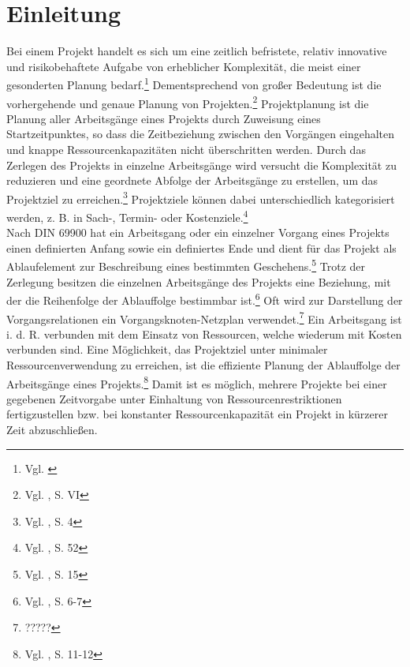 \documentclass[a4paper,12pt,parskip,bibtotoc,liststotoc]{article}
\begin{document}

\section{Einleitung} \label{start}
Bei einem Projekt handelt es sich um eine zeitlich befristete, relativ innovative und risikobehaftete Aufgabe von erheblicher Komplexität, die meist einer gesonderten Planung bedarf.\footnote{Vgl. \cite{projektdef}} Dementsprechend von großer Bedeutung ist die vorhergehende und genaue Planung von Projekten.\footnote{Vgl. \cite{zimmermann2006projektplanung}, S. VI\label{zum}} Projektplanung ist die Planung aller Arbeitsgänge eines Projekts durch Zuweisung eines Startzeitpunktes, so dass die Zeitbeziehung zwischen den Vorgängen eingehalten und knappe Ressourcenkapazitäten nicht überschritten werden. Durch das Zerlegen des Projekts in einzelne Arbeitsgänge wird versucht die Komplexität zu reduzieren und eine geordnete Abfolge der Arbeitsgänge zu erstellen, um das Projektziel zu erreichen.\footnote{Vgl. \cite{zimmermann2006projektplanung}, S. 4} Projektziele können dabei unterschiedlich kategorisiert werden, z. B. in Sach-, Termin- oder Kostenziele.\footnote{Vgl. \cite{felkai2011analysieren}, S. 52}\\

Nach DIN 69900 hat ein Arbeitsgang oder ein einzelner Vorgang eines Projekts einen definierten Anfang sowie ein definiertes Ende und dient für das Projekt als Ablaufelement zur Beschreibung eines bestimmten Geschehens.\footnote{Vgl. \cite{69900D}, S. 15} Trotz der Zerlegung besitzen die einzelnen Arbeitsgänge des Projekts eine Beziehung, mit der die Reihenfolge der Ablauffolge bestimmbar ist.\footnote{Vgl. \cite{kellenbrink2014einfuhrung}, S. 6-7} Oft wird zur Darstellung der Vorgangsrelationen ein Vorgangsknoten-Netzplan verwendet.\footnote{?????} %
Ein Arbeitsgang ist i. d. R. verbunden mit dem Einsatz von Ressourcen, welche wiederum mit Kosten verbunden sind. Eine Möglichkeit, das Projektziel unter minimaler Ressourcenverwendung zu erreichen, ist die effiziente Planung der Ablauffolge der Arbeitsgänge eines Projekts.\footnote{Vgl. \cite{bartels2009projektplanung}, S. 11-12} Damit ist es möglich, mehrere Projekte bei einer gegebenen Zeitvorgabe unter Einhaltung von Ressourcenrestriktionen fertigzustellen bzw. bei konstanter Ressourcenkapazität ein Projekt in kürzerer Zeit abzuschließen. \\
\end{document}
